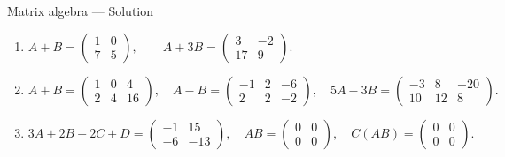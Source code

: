 \documentclass[9pt]{beamer}
\begin{document}
\begin{frame}{Matrix algebra — Solution}
\small
\begin{enumerate}[leftmargin = 0.35cm, label = \arabic*., rightmargin = 0.2cm]

\item 
$
A+B=\begin{pmatrix}1&0\\7&5\end{pmatrix},\qquad
A+3B=\begin{pmatrix}3&-2\\17&9\end{pmatrix}.
$
\medskip

\item 
$
A+B=\begin{pmatrix}1&0&4\\2&4&16\end{pmatrix},\quad
A-B=\begin{pmatrix}-1&2&-6\\2&2&-2\end{pmatrix},\quad
5A-3B=\begin{pmatrix}-3&8&-20\\10&12&8\end{pmatrix}.
$
\medskip

\item 
$
3A+2B-2C+D=\begin{pmatrix}-1&15\\-6&-13\end{pmatrix},\quad
AB=\begin{pmatrix}0&0\\0&0\end{pmatrix},\quad
C(AB)=\begin{pmatrix}0&0\\0&0\end{pmatrix}.
$
\medskip


\end{enumerate}
\end{frame}
\end{document}
